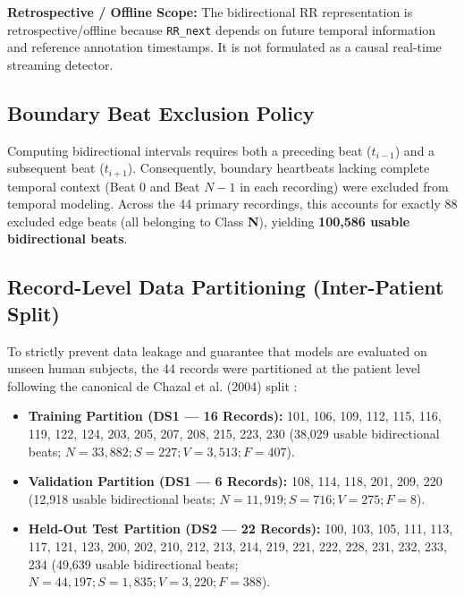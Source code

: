 \documentclass[conference]{IEEEtran}
\begin{document}
\noindent\textbf{Retrospective / Offline Scope:} The bidirectional RR representation is retrospective/offline because \texttt{RR\_next} depends on future temporal information and reference annotation timestamps. It is not formulated as a causal real-time streaming detector.

\subsection{Boundary Beat Exclusion Policy}
Computing bidirectional intervals requires both a preceding beat ($t_{i-1}$) and a subsequent beat ($t_{i+1}$). Consequently, boundary heartbeats lacking complete temporal context (Beat 0 and Beat $N-1$ in each recording) were excluded from temporal modeling. Across the 44 primary recordings, this accounts for exactly 88 excluded edge beats (all belonging to Class \textbf{N}), yielding \textbf{100,586 usable bidirectional beats}.

\subsection{Record-Level Data Partitioning (Inter-Patient Split)}
To strictly prevent data leakage and guarantee that models are evaluated on unseen human subjects, the 44 records were partitioned at the patient level following the canonical de Chazal et al. (2004) split \cite{dechazal2004automatic}:
\begin{itemize}
    \item \textbf{Training Partition (DS1 --- 16 Records):} 101, 106, 109, 112, 115, 116, 119, 122, 124, 203, 205, 207, 208, 215, 223, 230 (38,029 usable bidirectional beats; $N=33,882; S=227; V=3,513; F=407$).
    \item \textbf{Validation Partition (DS1 --- 6 Records):} 108, 114, 118, 201, 209, 220 (12,918 usable bidirectional beats; $N=11,919; S=716; V=275; F=8$).
    \item \textbf{Held-Out Test Partition (DS2 --- 22 Records):} 100, 103, 105, 111, 113, 117, 121, 123, 200, 202, 210, 212, 213, 214, 219, 221, 222, 228, 231, 232, 233, 234 (49,639 usable bidirectional beats; $N=44,197; S=1,835; V=3,220; F=388$).
\end{itemize}
\end{document}
